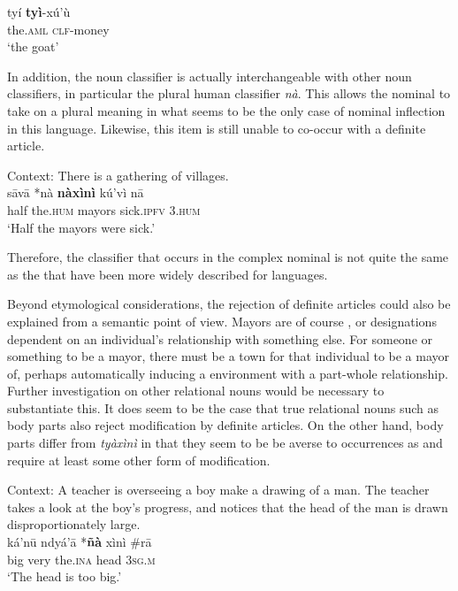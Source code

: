 \documentclass[output=paper,modfonts,nonflat]{langsci/langscibook}
\begin{document}
\ea {}\label{ex:cisneros:83}
\gll
ty\'i \textbf{ty\`i}-x\'u'\`u\\
the.\textsc{aml} \textsc{clf}-money\\
\glt
`the goat'
\z 

In addition, the noun classifier is actually interchangeable with other noun classifiers, in particular the plural human classifier \textit{n\`a}.  This allows the nominal to take on a plural  meaning in what seems to be the only case of nominal inflection in this language.  Likewise, this item is still unable to co-occur with a definite article.

\ea {}\label{ex:cisneros:84}
Context: There is a gathering of villages. \\
\gll
{\ob}s\=av\=a {\op}\textnormal{*}n\`a{\cp} \textbf{n\`ax\`in\`i}{\cb} k\'u'v\`i n\=a\\
{\db}half  \phantom{(*}the.\textsc{hum} mayors sick.\textsc{ipfv} 3.\textsc{hum}\\
\glt
`Half the mayors were sick.'
\z 

Therefore, the classifier that occurs in the complex nominal is not quite the same as the  that have been more widely described for  languages.  

Beyond etymological considerations, the rejection of definite articles could also be explained from a semantic point of view.  Mayors are of course , or designations dependent on an individual's relationship with something else.  For someone or something to be a mayor, there must be a town for that individual to be a mayor of, perhaps automatically inducing a  environment with a part-whole relationship.  Further investigation on other relational nouns would be necessary to substantiate this.  It does seem to be the case that true relational nouns such as body parts also reject modification by definite articles.  On the other hand, body parts differ from \textit{ty\`ax\`in\`i} in that they seem to be be averse to occurrences as  and require at least some other form of modification.\newpage 

\ea {}\label{ex:cisneros:85}
Context: A teacher is overseeing a boy make a drawing of a man.  The teacher takes a look at the boy's progress, and notices that the head of the man is drawn disproportionately large.\\
\gll
k\'a'n\=u ndy\'a'\=a {\op}\textnormal{*}\textbf{\~n\`a}{\cp} x\`in\`i \textnormal{\#}{\op}r\=a{\cp}\\
big very \phantom{(*}the.\textsc{ina} head \phantom{\#(}3\textsc{sg.m}\\
\glt
`The head is too big.'
\z 
\end{document}
